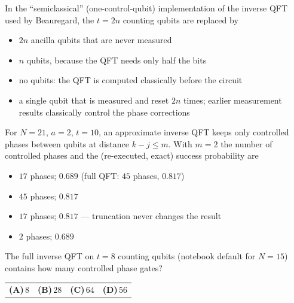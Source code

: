 \documentclass[11pt,a4paper]{article}
\newcommand{\optlabel}[1]{\textbf{(#1)}}
\newenvironment{qitem}[1]{\begin{list}{}{\setlength{\leftmargin}{3.3em}\setlength{\labelwidth}{3.1em}%
  \setlength{\labelsep}{0.2em}\setlength{\topsep}{3pt}\setlength{\parsep}{3pt}}\item[\textbf{Q.#1}\hfill]}{\end{list}}
\newcommand{\qsep}{\par\vspace{2pt}{\color{black!15}\hrule}\vspace{4pt}}
\begin{document}
\begin{qitem}{64}
In the ``semiclassical'' (one-control-qubit) implementation of the inverse QFT used by Beauregard, the $t = 2n$ counting qubits are replaced by
\begin{itemize}[leftmargin=2.6em, labelsep=0.4em, itemsep=2pt, topsep=3pt]
\item[\optlabel{A}] $2n$ ancilla qubits that are never measured
\item[\optlabel{B}] $n$ qubits, because the QFT needs only half the bits
\item[\optlabel{C}] no qubits: the QFT is computed classically before the circuit
\item[\optlabel{D}] a single qubit that is measured and reset $2n$ times; earlier measurement results classically control the phase corrections
\end{itemize}
\end{qitem}
\qsep

\begin{qitem}{65}
For $N = 21$, $a = 2$, $t = 10$, an approximate inverse QFT keeps only controlled phases between qubits at distance $k - j \le m$. With $m = 2$ the
number of controlled phases and the (re-executed, exact) success probability are
\begin{itemize}[leftmargin=2.6em, labelsep=0.4em, itemsep=2pt, topsep=3pt]
\item[\optlabel{A}] $17$ phases; $0.689$ (full QFT: $45$ phases, $0.817$)
\item[\optlabel{B}] $45$ phases; $0.817$
\item[\optlabel{C}] $17$ phases; $0.817$ --- truncation never changes the result
\item[\optlabel{D}] $2$ phases; $0.689$
\end{itemize}
\end{qitem}
\qsep

\begin{qitem}{66}
The full inverse QFT on $t = 8$ counting qubits (notebook default for $N = 15$) contains how many controlled phase gates?
\par\smallskip\noindent\begin{tabularx}{\linewidth}{@{}*{4}{L}@{}}
\optlabel{A}\,$8$ & \optlabel{B}\,$28$ & \optlabel{C}\,$64$ & \optlabel{D}\,$56$
\end{tabularx}
\end{qitem}
\qsep
\end{document}
